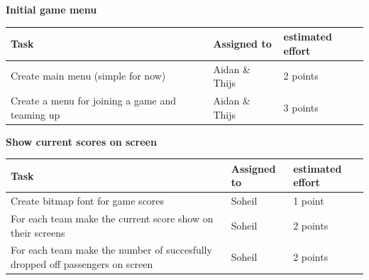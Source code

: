 \documentclass{article}
\begin{document}
\newline
\textbf{Initial game menu} \\
\begin{tabular}{ | l | l | l | }
\hline
\textbf{Task} & \textbf{Assigned to} & \textbf{estimated effort} \\ \hline
Create main menu (simple for now) & Aidan \& Thijs & 2 points\\ \hline
Create a menu for joining a game and teaming up & Aidan \& Thijs & 3 points\\ \hline
\end{tabular}
\newline
\textbf{Show current scores on screen} \\
\begin{tabular}{ | l | l | l | }
\hline
\textbf{Task} & \textbf{Assigned to} & \textbf{estimated effort} \\ \hline
Create bitmap font for game scores & Soheil & 1 point\\ \hline
For each team make the current score show on their screens & Soheil & 2 points\\ \hline
For each team make the number of succesfully dropped off passengers on screen & Soheil & 2 points\\ \hline
\end{tabular}
\end{document}
